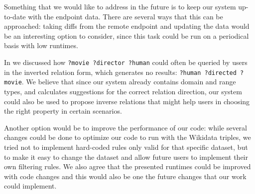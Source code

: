 Something that we would like to address in the future is to keep our system up-to-date with the endpoint data. There are several ways that this can be approached: taking diffs from the remote endpoint and updating the data would be an interesting option to consider, since this task could be run on a periodical basis with low runtimes. 

In  we discussed how \texttt{?movie ?director ?human} could often be queried by users in the inverted relation form, which generates no results: \texttt{?human ?directed ?movie}. We believe that since our system already contains domain and range types, and calculates suggestions for the correct relation direction, our system could also be used to propose inverse relations that might help users in choosing the right property in certain scenarios.

Another option would be to improve the performance of our code: while several changes could be done to optimize our code to run with the Wikidata triples, we tried not to implement hard-coded rules only valid for that specific dataset, but to make it easy to change the dataset and allow future users to implement their own filtering rules. We also agree that the presented runtimes could be improved with code changes and this would also be one the future changes that our work could implement.
